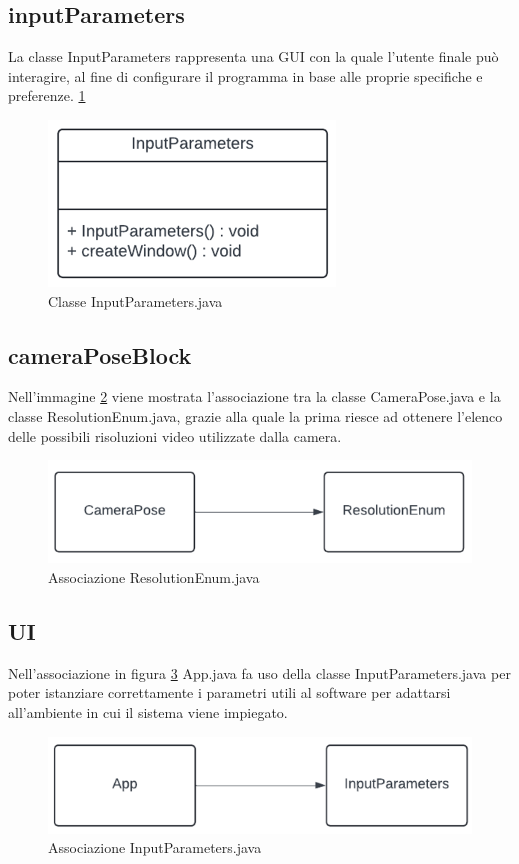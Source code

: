 \documentclass[12pt,a4paper,openright,twoside]{book}
\begin{document}
\subsection{inputParameters}
La classe InputParameters rappresenta una GUI con la quale l'utente finale può interagire, al fine di configurare il programma in base alle proprie specifiche e preferenze. \ref{fig:input_parameters}
\begin{figure}
	\centering
	\includegraphics[width=0.5\linewidth]{./figures/UML/inputParameters.png}
	\caption{Classe InputParameters.java}
	\label{fig:input_parameters}
\end{figure}
\subsection{cameraPoseBlock}
Nell'immagine \ref{fig:camera_pose_block} viene mostrata l'associazione tra la classe CameraPose.java e la classe ResolutionEnum.java, grazie alla quale la prima riesce ad ottenere l'elenco delle possibili risoluzioni video utilizzate dalla camera.
\begin{figure}
	\centering
	\includegraphics[width=0.5\linewidth]{./figures/UML/cameraPoseBlock.png}
	\caption{Associazione ResolutionEnum.java}
	\label{fig:camera_pose_block}
\end{figure}
\subsection{UI}
Nell'associazione in figura \ref{fig:UI} App.java fa uso della classe InputParameters.java per poter istanziare correttamente i parametri utili al software per adattarsi all'ambiente in cui il sistema viene impiegato.
\begin{figure}
	\centering
	\includegraphics[width=0.5\linewidth]{./figures/UML/UI.png}
	\caption{Associazione InputParameters.java}
	\label{fig:UI}
\end{figure}
\end{document}

